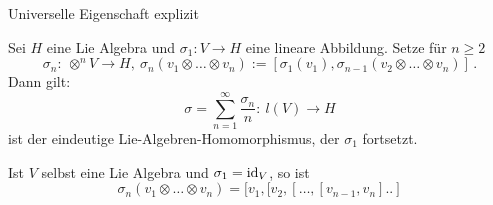 \documentclass{vorlage}
\begin{document}
\begin{frame}[<+->]{Universelle Eigenschaft explizit}
  \begin{satz}
    Sei $H$ eine Lie Algebra und $\sigma_1:V\to H$ eine lineare Abbildung.
    Setze für $n\geq 2$
    \[ \sigma_n:\ \otimes^n V \to H, \ \sigma_n(v_1\otimes\ldots\otimes v_n)
      := [\sigma_1(v_1),\sigma_{n-1}(v_2\otimes\ldots\otimes v_n)]\,.\]
    Dann gilt:
    \[ \sigma = \sum_{n=1}^\infty \frac{\sigma_n}{n}:\ l(V) \to H\]
    ist der eindeutige Lie-Algebren-Homomorphismus, der 
    $\sigma_1$ fortsetzt.
  \end{satz}
  \begin{beispiel}
    Ist $V$ selbst eine Lie Algebra und $\sigma_1 = \operatorname{id}_V$, so ist
    \[ \sigma_n(v_1\otimes\ldots\otimes v_n) = 
      [v_1,[v_2,[\ldots,[v_{n-1},v_n]..]\]
  \end{beispiel}
\end{frame}
\end{document}
